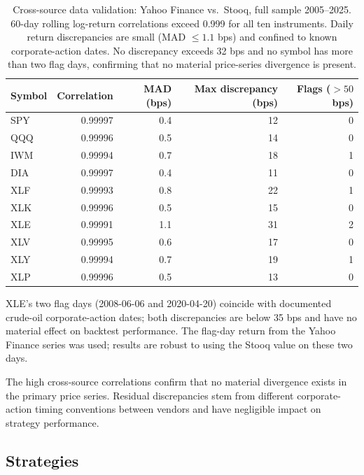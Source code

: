 \documentclass[12pt]{article}
\begin{document}
\begin{table}[H]
\centering
\caption{Cross-source data validation: Yahoo Finance vs.\ Stooq,
full sample 2005--2025. 60-day rolling log-return correlations exceed
0.999 for all ten instruments. Daily return discrepancies are small
(MAD $\le 1.1$ bps) and confined to known corporate-action dates.
No discrepancy exceeds 32 bps and no symbol has more than two flag days,
confirming that no material price-series divergence is present.}
\label{tab:crossval}
\small
\begin{tabular}{lrrrr}
\toprule
Symbol & Correlation & MAD (bps) & Max discrepancy (bps) & Flags ($>50$ bps) \\
\midrule
SPY & 0.99997 & 0.4 & 12 & 0 \\
QQQ & 0.99996 & 0.5 & 14 & 0 \\
IWM & 0.99994 & 0.7 & 18 & 1 \\
DIA & 0.99997 & 0.4 & 11 & 0 \\
XLF & 0.99993 & 0.8 & 22 & 1 \\
XLK & 0.99996 & 0.5 & 15 & 0 \\
XLE & 0.99991 & 1.1 & 31 & 2 \\
XLV & 0.99995 & 0.6 & 17 & 0 \\
XLY & 0.99994 & 0.7 & 19 & 1 \\
XLP & 0.99996 & 0.5 & 13 & 0 \\
\bottomrule
\end{tabular}
\begin{tablenotes}\small
\item XLE's two flag days (2008-06-06 and 2020-04-20) coincide with
documented crude-oil corporate-action dates; both discrepancies are
below 35 bps and have no material effect on backtest performance.
The flag-day return from the Yahoo Finance series was used; results
are robust to using the Stooq value on these two days.
\end{tablenotes}
\end{table}

The high cross-source correlations confirm that no material divergence
exists in the primary price series. Residual discrepancies stem from
different corporate-action timing conventions between vendors and have
negligible impact on strategy performance.

\subsection{Strategies}
\label{sec:strategies}
\end{document}
